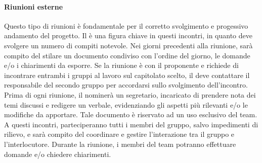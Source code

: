 			\paragraph{Riunioni esterne}
			Questo tipo di riunioni è fondamentale per il corretto svolgimento e progessivo andamento del progetto.
			Il \textit{\RdP} è una figura chiave in questi incontri, in quanto deve svolgere un numero di compiti notevole.
			Nei giorni precedenti alla riunione, sarà compito del \textit{\RdP} stilare un documento condiviso con l'ordine del giorno, le domande e/o i chiarimenti da esporre. Se la riunione è con il proponente e richiede di incontrare entrambi i gruppi al lavoro sul capitolato scelto, il \textit{\RdP} deve contattare il responsabile del secondo gruppo per accordarsi sullo svolgimento dell'incontro. Prima di ogni riunione, il \textit{\RdP} nominerà un segretario, incaricato di prendere nota dei temi discussi e redigere un verbale, evidenziando gli aspetti più rilevanti e/o le modifiche da apportare. Tale documento è riservato ad un uso esclusivo del team.
			A questi incontri, parteciperanno tutti i membri del gruppo, salvo impedimenti di rilievo, e sarà compito del \textit{\RdP} coordinare e gestire l'interazione tra il gruppo e l'interlocutore. Durante la riunione, i membri del team potranno effettuare domande e/o chiedere chiarimenti. 
			
